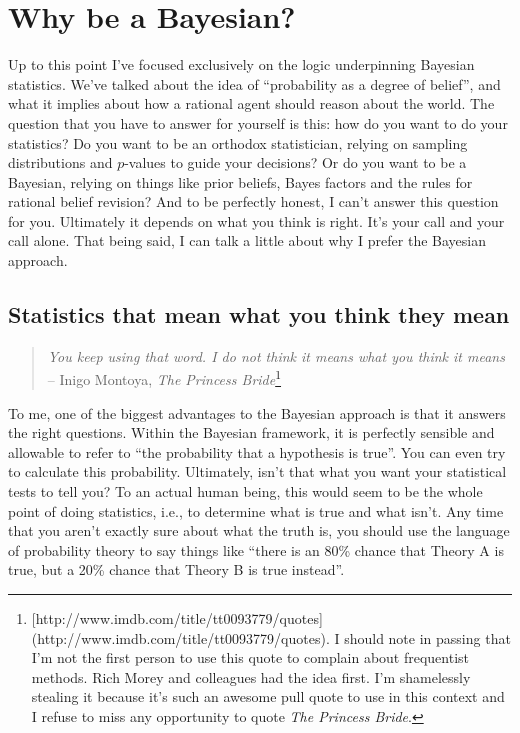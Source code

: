 \documentclass[
  a4paper,
]{book}
\begin{document}
\hypertarget{why-be-a-bayesian}{%
\section{Why be a Bayesian?}\label{why-be-a-bayesian}}

Up to this point I've focused exclusively on the logic underpinning
Bayesian statistics. We've talked about the idea of ``probability as a
degree of belief'', and what it implies about how a rational agent
should reason about the world. The question that you have to answer for
yourself is this: how do you want to do your statistics? Do you want to
be an orthodox statistician, relying on sampling distributions and
\(p\)-values to guide your decisions? Or do you want to be a Bayesian,
relying on things like prior beliefs, Bayes factors and the rules for
rational belief revision? And to be perfectly honest, I can't answer
this question for you. Ultimately it depends on what you think is right.
It's your call and your call alone. That being said, I can talk a little
about why I prefer the Bayesian approach.

\hypertarget{statistics-that-mean-what-you-think-they-mean}{%
\subsection{Statistics that mean what you think they
mean}\label{statistics-that-mean-what-you-think-they-mean}}

\begin{quote}
\emph{You keep using that word. I do not think it means what you think
it means}\\
-- Inigo Montoya, \emph{The Princess Bride}\footnote{{[}http://www.imdb.com/title/tt0093779/quotes{]}
  (http://www.imdb.com/title/tt0093779/quotes). I should note in passing
  that I'm not the first person to use this quote to complain about
  frequentist methods. Rich Morey and colleagues had the idea first. I'm
  shamelessly stealing it because it's such an awesome pull quote to use
  in this context and I refuse to miss any opportunity to quote
  \emph{The Princess Bride}.}
\end{quote}

To me, one of the biggest advantages to the Bayesian approach is that it
answers the right questions. Within the Bayesian framework, it is
perfectly sensible and allowable to refer to ``the probability that a
hypothesis is true''. You can even try to calculate this probability.
Ultimately, isn't that what you want your statistical tests to tell you?
To an actual human being, this would seem to be the whole point of doing
statistics, i.e., to determine what is true and what isn't. Any time
that you aren't exactly sure about what the truth is, you should use the
language of probability theory to say things like ``there is an 80\%
chance that Theory A is true, but a 20\% chance that Theory B is true
instead''.
\end{document}
